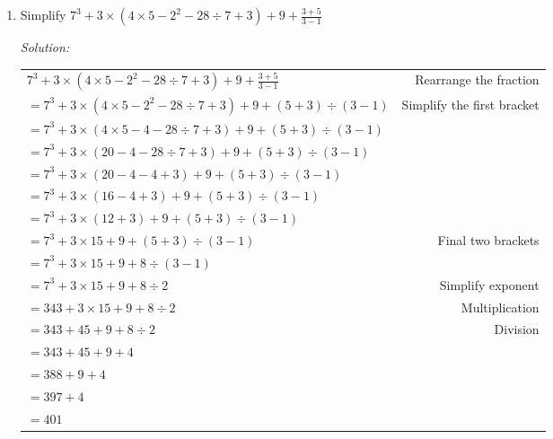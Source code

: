\documentclass[16pt]{article}
\theoremstyle{remark}
\begin{document}
\begin{enumerate}
\begin{mdframed}[style=TheoremFrame]
\end{mdframed}
\item Simplify $\displaystyle{7^3 + 3\times (4 \times 5 - 2^2 -28 \div 7 +3) + 9 + \frac{3+5}{3-1}}$
\begin{mdframed}[style=TheoremFrame]
\textit{Solution:}
\begin{center}
\begin{tabular}{l r}
$\displaystyle{7^3 + 3\times (4 \times 5 - 2^2 -28 \div 7 +3) + 9 + \frac{3+5}{3-1}}$ & Rearrange the fraction \\
$= 7^3 + 3\times (4 \times 5 - 2^2 -28 \div 7 +3) + 9 + (5+3)\div(3-1)$ & Simplify the first bracket\\
$= 7^3 + 3\times (4 \times 5 - 4 -28 \div 7 +3) + 9 + (5+3)\div(3-1)$ &\\
$= 7^3 + 3\times (20 - 4 -28 \div 7 +3) + 9 + (5+3)\div(3-1)$ &\\
$= 7^3 + 3\times (20 - 4 -4 +3) + 9 + (5+3)\div(3-1)$ &\\
$= 7^3 + 3\times (16 -4 +3) + 9 + (5+3)\div(3-1)$ &\\
$= 7^3 + 3\times (12 +3) + 9 + (5+3)\div(3-1)$ &\\
$= 7^3 + 3\times 15 + 9 + (5+3)\div(3-1)$ & Final two brackets\\
$= 7^3 + 3\times 15 + 9 + 8\div(3-1)$ &\\
$= 7^3 + 3\times 15 + 9 + 8\div 2$ & Simplify exponent\\
$= 343 + 3\times 15 + 9 + 8\div 2$ & Multiplication\\
$= 343 + 45 + 9 + 8\div 2$ & Division\\
$= 343 + 45 + 9 + 4$ &\\
$= 388 + 9 + 4$ &\\
$= 397 + 4$ &\\
$= 401 $ & 
\end{tabular}
\end{center}


\end{mdframed}
\end{enumerate}
\end{document}
